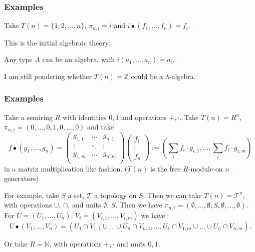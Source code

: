 \documentclass[aspectratio=169]{fancyslides} %
\begin{document}
  \begin{frame}
    \frametitle{Examples}

    Take $ T(n) = \{ 1, 2, \dots, n \} $, $ \pi_{n, i} = i $ and $ i \bullet (f_1, \dots, f_n) = f_i $.
    
    This is the initial algebraic theory.

    \pause
    \vfill
      
    Any type $ A $ can be an algebra, with $ i (a_1, \dots, a_n) = a_i $.

    \pause
    \vfill

    I am still pondering whether $ T(n) = \mathbb Z $ could be a $ \lambda $-algebra.
  \end{frame}

  \begin{frame}
    \frametitle{Examples}

    Take a semiring $ R $ with identities $ 0, 1 $ and operations $ +, \cdot $. Take $ T(n) = R^n $, $ \pi_{n, i} = (0, \dots, 0, 1, 0, \dots, 0) $ and take 
    \[ f \bullet (g_1, \dots, g_n) = \begin{pmatrix}
      g_{1, 1} & \dots & g_{n, 1}\\
      \vdots & \ddots & \vdots\\
      g_{1, m} & \dots & g_{n, m}\\
    \end{pmatrix} \begin{pmatrix}
      f_1 \\ \vdots \\ f_n
    \end{pmatrix} := \left( \sum_i f_i \cdot g_{i, 1}, \dots, \sum_i f_i \cdot g_{i, m} \right) \]
    in a matrix multiplication like fashion. ($ T(n) $ is the free $ R $-module on $ n $ generators)

    \pause
    \vfill

    For example, take $ S $ a set, $ \mathcal T $ a topology on $ S $. Then we can take $ T(n) = \mathcal T^n $, with operations $ \cup $, $ \cap $, and units $ \emptyset $, $ S $. Then we have $ \pi_{n, i} = (\emptyset, \dots, \emptyset, S, \emptyset, \dots, \emptyset) $. For $ U = (U_1, \dots, U_n) $, $ V_i = (V_{i, 1}, \dots, V_{i, m}) $ we have
    \[ U \bullet (V_1, \dots, V_n) = (U_1 \cap V_{1, 1} \cup \dots \cup U_n \cap V_{n, 1}, \dots, U_1 \cap V_{1, m} \cup \dots \cup U_n \cap V_{n, m}). \]

    \pause
    \vfill

    Or take $ R = \mathbb N $, with operations $ +, \cdot $ and units $ 0, 1 $.
  \end{frame}
\end{document}
